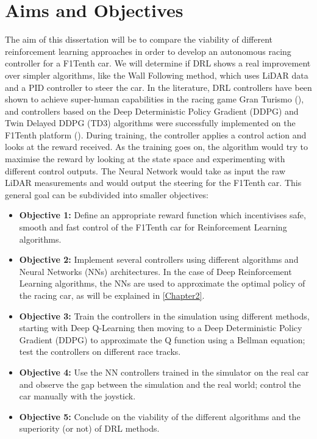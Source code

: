 \section{Aims and Objectives}
\label{metricssection}

The aim of this dissertation will be to compare the viability of different reinforcement learning approaches in order to develop an autonomous racing controller for a F1Tenth car. We will determine if DRL shows a real improvement over simpler algorithms, like the Wall Following method, which uses LiDAR data and a PID controller to steer the car. In the literature, DRL controllers have been shown to achieve super-human capabilities in the racing game Gran Turismo (\cite{granturismo}), and controllers based on the Deep Deterministic Policy Gradient (DDPG) and Twin Delayed DDPG (TD3) algorithms were successfully implemented on the F1Tenth platform (\cite{Reference4}). During training, the controller applies a control action and looks at the reward received. As the training goes on, the algorithm would try to maximise the reward by looking at the state space and experimenting with different control outputs. The Neural Network would take as input the raw LiDAR measurements and would output the steering for the F1Tenth car. This general goal can be subdivided into smaller objectives:

\begin{itemize}
\item \textbf{Objective 1:} Define an appropriate reward function which incentivises safe, smooth and fast control of the F1Tenth car for Reinforcement Learning algorithms.
\item \textbf{Objective 2:} Implement several controllers using different algorithms and Neural Networks (NNs) architectures. In the case of Deep Reinforcement Learning algorithms, the NNs are used to approximate the optimal policy of the racing car, as will be explained in \ref{Chapter2}.
\item \textbf{Objective 3:} Train the controllers in the simulation using different methods, starting with Deep Q-Learning then moving to a Deep Deterministic Policy Gradient (DDPG) to approximate the Q function using a Bellman equation; test the controllers on different race tracks.
\item \textbf{Objective 4:} Use the NN controllers trained in the simulator on the real car and observe the gap between the simulation and the real world; control the car manually with the joystick.
\item \textbf{Objective 5:} Conclude on the viability of the different algorithms and the superiority (or not) of DRL methods.
\end{itemize}

